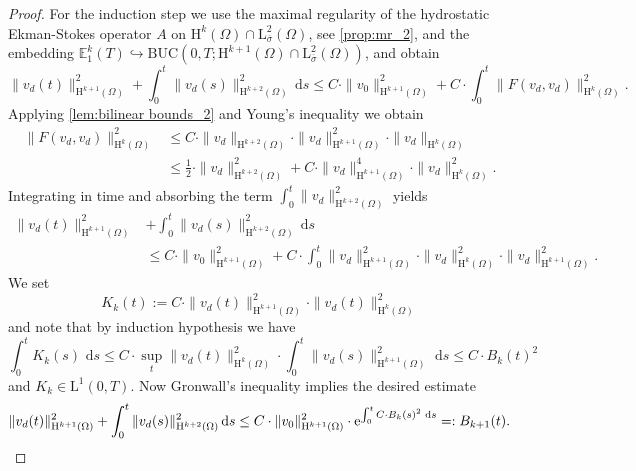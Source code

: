 \documentclass[preprint]{elsarticle}
\numberwithin{equation}{section}
\newcommand {\E}	{\mathbb{E}}
\renewcommand{\d}{\, \mathrm{d}}
\renewcommand{\H}{\mathrm{H}}
\newcommand{\sigmabar}{\bar{\sigma}}
\renewcommand{\bar}[1]{\overline{#1}}
\newcommand{\rL}{\mathrm{L}}
\newcommand{\rH}{\H}
\begin{document}
\begin{proof}
	For the induction step we use the maximal regularity of the hydrostatic Ekman-Stokes operator $A$ on $\rH^k(\Omega) \cap \rL^2_{\sigmabar}(\Omega)$, see \autoref{prop:mr_2}, and the embedding $\E_1^k(T) \hookrightarrow \mathrm{BUC}(0,T;\rH^{k+1}(\Omega) \cap \rL^2_{\sigmabar}(\Omega))$, and obtain
	\begin{equation*}
		\| v_d(t) \|_{\rH^{k+1}(\Omega)}^2
		+ 
		\int_0^t \| v_d(s) \|_{\rH^{k+2}(\Omega)}^2 \d s 	
		\leq 
		C \cdot \| v_0 \|_{\rH^{k+1}(\Omega)}^2 
		+ C \cdot \int_0^t \| F(v_d,v_d) \|_{\rH^k(\Omega)}^2 .
	\end{equation*} 
	Applying \autoref{lem:bilinear bounds_2} and Young's inequality we obtain
	\begin{align*}
		\| F(v_d,v_d) \|_{\rH^k(\Omega)}^2
		&\leq C \cdot \| v_d \|_{\rH^{k+2}(\Omega)} \cdot \| v_d \|_{\rH^{k+1}(\Omega)}^2 \cdot \| v_d \|_{\rH^{k}(\Omega)} \\
		&\leq \frac{1}{2} \cdot \| v_d \|_{\rH^{k+2}(\Omega)}^2
		+ C
		\cdot \| v_d \|_{\rH^{k+1}(\Omega)}^4 \cdot \| v_d \|_{\rH^{k}(\Omega)}^2 .
	\end{align*}
	Integrating in time and absorbing the term  $\int_0^t \| v_d \|_{\rH^{k+2}(\Omega)}^2$ yields
	\begin{align*}
		\| v_d(t) \|_{\rH^{k+1}(\Omega)}^2
		&+ 
		\int_0^t \| v_d(s) \|_{\rH^{k+2}(\Omega)}^2 \d s \\	
		&\leq 
		C \cdot \| v_0 \|_{\rH^{k+1}(\Omega)}^2 
		+ C \cdot \int_0^t \| v_d \|_{\rH^{k+1}(\Omega)}^2 \cdot \| v_d \|_{\rH^{k}(\Omega)}^2 \cdot \| v_d \|_{\rH^{k+1}(\Omega)}^2 .
	\end{align*} 
	We set 
	\begin{equation*}
		K_k(t) := C \cdot \| v_d(t) \|_{\rH^{k+1}(\Omega)}^2 \cdot \| v_d(t) \|_{\rH^{k}(\Omega)}^2
	\end{equation*}
	and note that by induction hypothesis we have
	\begin{equation*}
		\int_0^t K_k(s) \, \d s
		\leq C \cdot \sup_{t} \| v_d(t) \|_{\rH^{k}(\Omega)}^2
		\cdot \int_0^t  \| v_d(s) \|_{\rH^{k+1}(\Omega)}^2 \, \d s
		\leq C \cdot B_k(t)^2  
	\end{equation*}
	and $K_k \in \rL^1(0,T)$. Now Gronwall's inequality implies the desired estimate
	\begin{equation*}
		\| v_d(t) \|_{\rH^{k+1}(\Omega)}^2
		+ 
		\int_0^t \| v_d(s) \|_{\rH^{k+2}(\Omega)}^2 \d s 	
		\leq 
		C \cdot \| v_0 \|_{\rH^{k+1}(\Omega)}^2
		\cdot \mathrm{e}^{ \int_0^t C \cdot B_k(s)^2 \, \d s} =: B_{k+1}(t). \qedhere 
	\end{equation*}
\end{proof}
\end{document}
